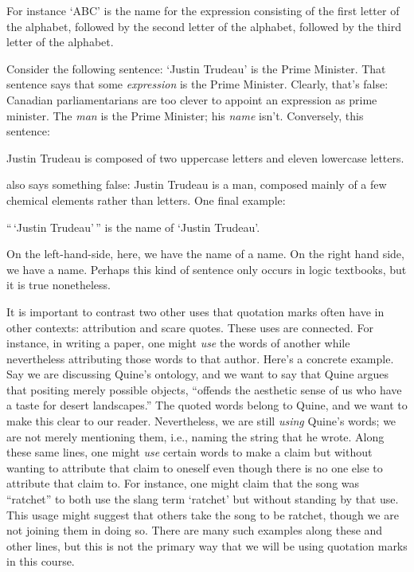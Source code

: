 
For instance `ABC' is the name for the expression consisting of the first letter of the alphabet, followed by the second letter of the alphabet, followed by the third letter of the alphabet.

Consider the following sentence: `Justin Trudeau' is the Prime Minister.
That sentence says that some \emph{expression} is the Prime Minister.
Clearly, that's false: Canadian parliamentarians are too clever to appoint an expression as prime minister.
The \emph{man} is the Prime Minister; his \emph{name} isn't.
Conversely, this sentence:
  \begin{earg}
    \item[\ex{use3}] Justin Trudeau is composed of two uppercase letters and eleven lowercase letters. 
  \end{earg}
also says something false: Justin Trudeau is a man, composed mainly of a few chemical elements rather than letters. One final example:
  \begin{earg}
    \item[\ex{use4}] ``\,`Justin Trudeau'\,'' is the name of `Justin Trudeau'. 
  \end{earg}
On the left-hand-side, here, we have the name of a name. On the right hand side, we have a name. Perhaps this kind of sentence only occurs in logic textbooks, but it is true nonetheless.

It is important to contrast two other uses that quotation marks often have in other contexts: attribution and scare quotes.
These uses are connected.
For instance, in writing a paper, one might \textit{use} the words of another while nevertheless attributing those words to that author.
Here's a concrete example.
Say we are discussing Quine's ontology, and we want to say that Quine argues that positing merely possible objects, ``offends the aesthetic sense of us who have a taste for desert landscapes.''
The quoted words belong to Quine, and we want to make this clear to our reader.
Nevertheless, we are still \textit{using} Quine's words; we are not merely mentioning them, i.e., naming the string that he wrote.
Along these same lines, one might \textit{use} certain words to make a claim but without wanting to attribute that claim to oneself even though there is no one else to attribute that claim to.
For instance, one might claim that the song was ``ratchet'' to both use the slang term `ratchet' but without standing by that use.
This usage might suggest that others take the song to be ratchet, though we are not joining them in doing so.
There are many such examples along these and other lines, but this is not the primary way that we will be using quotation marks in this course.

